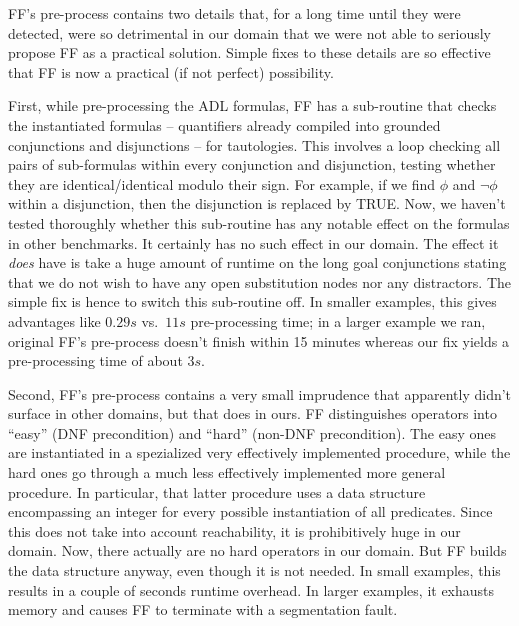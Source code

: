 FF's pre-process contains two details that, for a long time until they
were detected, were so detrimental in our domain that we were not able
to seriously propose FF as a practical solution. Simple fixes to these
details are so effective that FF is now a practical (if not perfect)
possibility.



First, while pre-processing the ADL formulas, FF has a sub-routine
that checks the instantiated formulas -- quantifiers already compiled
into grounded conjunctions and disjunctions -- for tautologies. This
involves a loop checking all pairs of sub-formulas within every
conjunction and disjunction, testing whether they are
identical/identical modulo their sign. For example, if we find $\phi$
and $\neg \phi$ within a disjunction, then the disjunction is replaced
by TRUE. Now, we haven't tested thoroughly whether this sub-routine
has any notable effect on the formulas in other benchmarks. It
certainly has no such effect in our domain. The effect it {\em does}
have is take a huge amount of runtime on the long goal conjunctions
stating that we do not wish to have any open substitution nodes nor
any distractors. The simple fix is hence to switch this sub-routine
off. In smaller examples, this gives advantages like $0.29s$
vs.\ $11s$ pre-processing time; in a larger example we ran, original
FF's pre-process doesn't finish within 15 minutes whereas our fix
yields a pre-processing time of about $3s$.


Second, FF's pre-process contains a very small imprudence that
apparently didn't surface in other domains, but that does in ours. FF
distinguishes operators into ``easy'' (DNF precondition) and ``hard''
(non-DNF precondition). The easy ones are instantiated in a
spezialized very effectively implemented procedure, while the hard
ones go through a much less effectively implemented more general
procedure. In particular, that latter procedure uses a data structure
encompassing an integer for every possible instantiation of all
predicates. Since this does not take into account reachability, it is
prohibitively huge in our domain. Now, there actually are no hard
operators in our domain. But FF builds the data structure anyway, even
though it is not needed. In small examples, this results in a couple
of seconds runtime overhead. In larger examples, it exhausts memory
and causes FF to terminate with a segmentation fault.




















